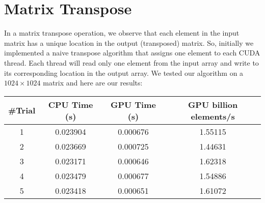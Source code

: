 \section{Matrix Transpose}
\label{sec:extra}

In a matrix transpose operation, we observe that each element in the input matrix has a unique location in the output (transposed) matrix. So, initially we implemented a naive transpose algorithm that assigns one element to each CUDA thread. Each thread will read only one element from the input array and write to its corresponding location in the output array. We tested our algorithm on a $1024 \times 1024$ matrix and here are our results:

\begin{center}
	\begin{tabular}{||c c c c||} 
		\hline
		\#Trial & CPU Time (s) & GPU Time (s) & GPU billion elements/s \\ [0.5ex] 
		\hline\hline
		1 & 0.023904 & 0.000676 & 1.55115 \\ 
		\hline
		2 & 0.023669 & 0.000725 &  1.44631 \\
		\hline
		3 & 0.023171 & 0.000646 & 1.62318 \\
		\hline
		4 & 0.023479 & 0.000677 & 1.54886 \\
		\hline
		5 & 0.023418 & 0.000651 & 1.61072 \\
		\hline
	\end{tabular}
\end{center}